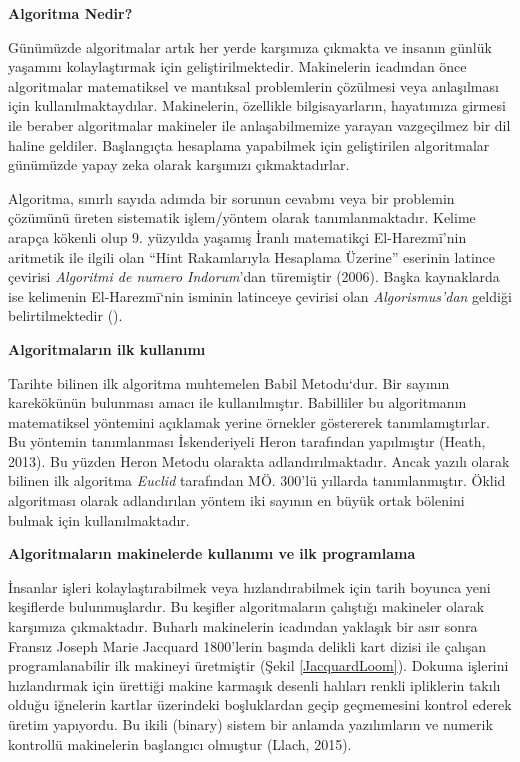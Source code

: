 \documentclass[12pt,turkish,a4paperpaper,]{report}
\begin{document}
\textbf{Algoritma Nedir?}

Günümüzde algoritmalar artık her yerde karşımıza çıkmakta ve insanın
günlük yaşamını kolaylaştırmak için geliştirilmektedir. Makinelerin
icadından önce algoritmalar matematiksel ve mantıksal problemlerin
çözülmesi veya anlaşılması için kullanılmaktaydılar. Makinelerin,
özellikle bilgisayarların, hayatımıza girmesi ile beraber algoritmalar
makineler ile anlaşabilmemize yarayan vazgeçilmez bir dil haline
geldiler. Başlangıçta hesaplama yapabilmek için geliştirilen
algoritmalar günümüzde yapay zeka olarak karşımızı çıkmaktadırlar.

Algoritma, sınırlı sayıda adımda bir sorunun cevabını veya bir problemin
çözümünü üreten sistematik işlem/yöntem olarak tanımlanmaktadır. Kelime
arapça kökenli olup 9. yüzyılda yaşamış İranlı matematikçi
El-Harezmī'nin aritmetik ile ilgili olan ``Hint Rakamlarıyla Hesaplama
Üzerine'' eserinin latince çevirisi \emph{Algoritmi de numero
Indorum}'dan türemiştir (2006). Başka kaynaklarda ise kelimenin
El-Harezmī`nin isminin latinceye çevirisi olan \emph{Algorismus'dan}
geldiği belirtilmektedir ().

\textbf{Algoritmaların ilk kullanımı}

Tarihte bilinen ilk algoritma muhtemelen Babil Metodu`dur. Bir sayının
karekökünün bulunması amacı ile kullanılmıştır. Babilliler bu
algoritmanın matematiksel yöntemini açıklamak yerine örnekler göstererek
tanımlamıştırlar. Bu yöntemin tanımlanması İskenderiyeli Heron
tarafından yapılmıştır (Heath, 2013). Bu yüzden Heron Metodu olarakta
adlandırılmaktadır. Ancak yazılı olarak bilinen ilk algoritma
\emph{Euclid} tarafından MÖ. 300'lü yıllarda tanımlanmıştır. Öklid
algoritması olarak adlandırılan yöntem iki sayının en büyük ortak
bölenini bulmak için kullanılmaktadır.

\textbf{Algoritmaların makinelerde kullanımı ve ilk programlama}

İnsanlar işleri kolaylaştırabilmek veya hızlandırabilmek için tarih
boyunca yeni keşiflerde bulunmuşlardır. Bu keşifler algoritmaların
çalıştığı makineler olarak karşımıza çıkmaktadır. Buharlı makinelerin
icadından yaklaşık bir asır sonra Fransız Joseph Marie Jacquard
1800'lerin başında delikli kart dizisi ile çalışan programlanabilir ilk
makineyi üretmiştir (Şekil \ref{JacquardLoom}). Dokuma işlerini
hızlandırmak için ürettiği makine karmaşık desenli halıları renkli
ipliklerin takılı olduğu iğnelerin kartlar üzerindeki boşluklardan geçip
geçmemesini kontrol ederek üretim yapıyordu. Bu ikili (binary) sistem
bir anlamda yazılımların ve numerik kontrollü makinelerin başlangıcı
olmuştur (Llach, 2015).
\end{document}
